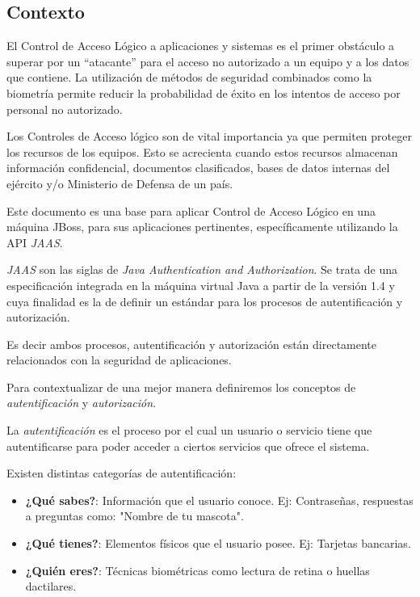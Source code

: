 
\subsection{Contexto}
El Control de Acceso Lógico a aplicaciones y sistemas es el primer obstáculo a
superar por un “atacante” para el acceso no autorizado a un equipo y a los
datos que contiene. La utilización de métodos de seguridad combinados como la
biometría permite reducir la probabilidad de éxito en los intentos de acceso
por personal no autorizado.

Los Controles de Acceso lógico son de vital importancia ya que permiten
proteger los recursos de los equipos. Esto se acrecienta cuando estos recursos
almacenan información confidencial, documentos clasificados, bases de datos
internas del ejército y/o Ministerio de Defensa de un país.

Este documento es una base para aplicar Control de Acceso Lógico en una máquina
JBoss, para sus aplicaciones pertinentes, específicamente utilizando la API \emph{JAAS}.

\emph{JAAS} son las siglas de \emph{Java Authentication and Authorization}. Se
trata de una especificación integrada en la máquina virtual Java a partir de
la versión 1.4 y cuya finalidad es la de definir un estándar para los procesos
de autentificación y autorización.

Es decir ambos procesos, autentificación y autorización están directamente
relacionados con la seguridad de aplicaciones.

Para contextualizar de una mejor manera definiremos los conceptos de \emph{autentificación} y \emph{autorización}.

La \emph{autentificación} es el proceso por el cual un usuario o servicio tiene que
autentificarse para poder acceder a ciertos servicios que ofrece el sistema.

Existen distintas categorías de autentificación:
\begin{itemize}
	\item \textbf{¿Qué sabes?}: Información que el usuario conoce. Ej: Contraseñas, respuestas a preguntas como: "Nombre de tu mascota".
	\item \textbf{¿Qué tienes?}: Elementos físicos que el usuario posee. Ej: Tarjetas bancarias.
	\item \textbf{¿Quién eres?}: Técnicas biométricas como lectura de retina o huellas dactilares.
\end{itemize}

